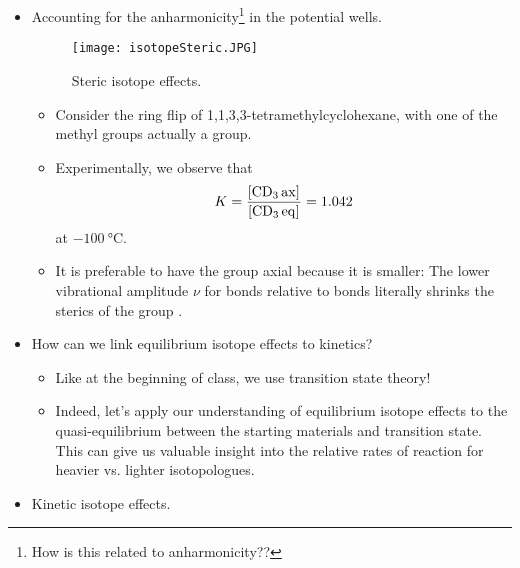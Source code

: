 \documentclass[../notes.tex]{subfiles}
\begin{document}
\begin{itemize}
    \item Accounting for the anharmonicity\footnote{How is this related to anharmonicity??} in the potential wells.
    \begin{figure}[H]
        \centering
        \texttt{[image: isotopeSteric.JPG]}
        \caption{Steric isotope effects.}
        \label{fig:isotopeSteric}
    \end{figure}
    \begin{itemize}
        \item Consider the ring flip of 1,1,3,3-tetramethylcyclohexane, with one of the methyl groups actually a  group.
        \item Experimentally, we observe that
        \begin{equation*}
            K = \frac{\cnc{CD3 ax}}{\cnc{CD3 eq}} = 1.042
        \end{equation*}
        at $-\SI{100}{\celsius}$.
        \item It is preferable to have the  group axial because it is smaller: The lower vibrational amplitude $\nu$ for  bonds relative to  bonds literally shrinks the sterics of the group \parencite[430,434]{bib:Anslyn}.
    \end{itemize}
    \item How can we link equilibrium isotope effects to kinetics?
    \begin{itemize}
        \item Like at the beginning of class, we use transition state theory!
        \item Indeed, let's apply our understanding of equilibrium isotope effects to the quasi-equilibrium between the starting materials and transition state. This can give us valuable insight into the relative rates of reaction for heavier vs. lighter isotopologues.
    \end{itemize}
    \item Kinetic isotope effects.
    \begin{figure}[h!]
        \centering
\end{figure}
\end{itemize}
\end{document}
